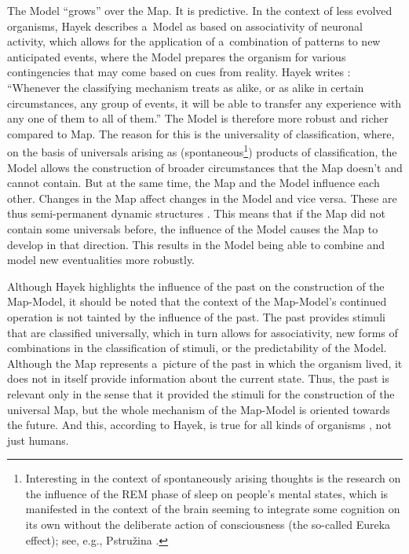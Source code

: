 The Model ``grows'' over the Map. It is predictive. In the context of less evolved organisms, Hayek describes a~Model as based on associativity of neuronal activity, which allows for the application of a~combination of patterns to new anticipated events, where the Model prepares the organism for various contingencies that may come based on cues from reality. Hayek writes 
\parencite[][sec.5.87]{}: %
 ``Whenever the classifying mechanism treats as alike, or as alike in certain circumstances, any group of events, it will be able to transfer any experience with any one of them to all of them.'' The Model is therefore more robust and richer compared to Map. The reason for this is the universality of classification, where, on the basis of universals arising as (spontaneous\footnote{Interesting in the context of spontaneously arising thoughts is the research on the influence of the REM phase of sleep on people's mental states, which is manifested in the context of the brain seeming to integrate some cognition on its own without the deliberate action of consciousness (the so-called Eureka effect); see, e.g., Pstružina 
\parencite*[][]{}.%
}) products of classification, the Model allows the construction of broader circumstances that the Map doesn't and cannot contain. But at the same time, the Map and the Model influence each other. Changes in the Map affect changes in the Model and vice versa. These are thus semi-permanent dynamic structures 
\parencite[][sec.5.43]{}. %
 This means that if the Map did not contain some universals before, the influence of the Model causes the Map to develop in that direction. This results in the Model being able to combine and model new eventualities more robustly.



Although Hayek highlights the influence of the past on the construction of the Map-Model, it should be noted that the context of the Map-Model's continued operation is not tainted by the influence of the past. The past provides stimuli that are classified universally, which in turn allows for associativity, new forms of combinations in the classification of stimuli, or the predictability of the Model. Although the Map 
\parencite[][sec.5.42]{} %
 represents a~picture of the past in which the organism lived, it does not in itself provide information about the current state. Thus, the past is relevant only in the sense that it provided the stimuli for the construction of the universal Map, but the whole mechanism of the Map-Model is oriented towards the future. And this, according to Hayek, is true for all kinds of organisms 
\parencite[][sec.5.61]{}, %
 not just humans.



